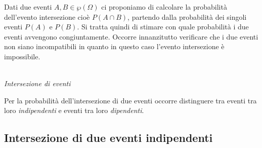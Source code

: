 \noindent\begin{minipage}{.59\textwidth}
Dati due eventi \(A,B\in \wp (\Omega )\) ci proponiamo di calcolare la 
probabilità dell'evento intersezione cioè \(P(A\cap B)\), partendo dalla 
probabilità dei singoli eventi \( P(A) \) e \( P(B) \). 
Si tratta quindi di stimare con quale probabilità i due eventi avvengono 
congiuntamente. Occorre innanzitutto verificare che i due eventi non siano 
incompatibili in quanto in questo caso l'evento intersezione è impossibile.
\end{minipage}
\hfill
\begin{minipage}{.39\textwidth}
\begin{inaccessibleblock}[Intersezione]
\begin{center} 
\intersezioneeventi \\
\emph{Intersezione di eventi}
\end{center}
\end{inaccessibleblock}
\end{minipage}

Per la probabilità dell'intersezione di due eventi occorre distinguere tra 
eventi tra loro \emph{indipendenti} e eventi tra loro \emph{dipendenti}.

\subsection{Intersezione di due eventi indipendenti}

